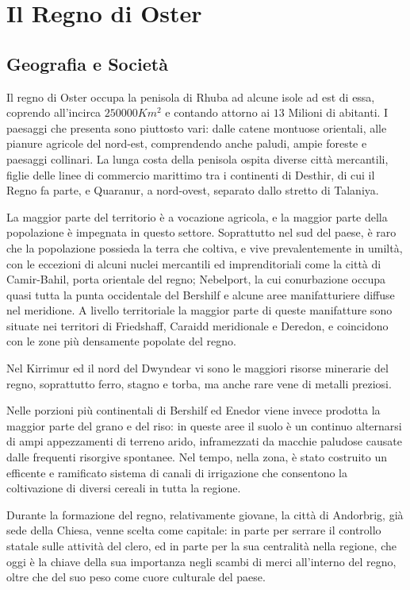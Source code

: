 \section{Il Regno di Oster}


\subsection{Geografia e Società}
Il regno di Oster occupa la penisola di Rhuba ad alcune isole ad est di essa, coprendo all'incirca $250000Km^2$ e contando attorno ai $13$ Milioni di abitanti. I paesaggi che presenta sono piuttosto vari: dalle catene montuose orientali, alle pianure agricole del nord-est, comprendendo anche paludi, ampie foreste e paesaggi collinari.
La lunga costa della penisola ospita diverse città mercantili, figlie delle linee di commercio marittimo tra i continenti di Desthir, di cui il Regno fa parte, e Quaranur, a nord-ovest, separato dallo stretto di Talaniya.

La maggior parte del territorio è a vocazione agricola, e la maggior parte della popolazione è impegnata in questo settore. Soprattutto nel sud del paese, è raro che la popolazione possieda la terra che coltiva, e vive prevalentemente in umiltà, con le eccezioni di alcuni nuclei mercantili ed imprenditoriali come la città di Camir-Bahil, porta orientale del regno; Nebelport, la cui conurbazione occupa quasi tutta la punta occidentale del Bershilf e alcune aree manifatturiere diffuse nel meridione.
A livello territoriale la maggior parte di queste manifatture sono situate nei territori di Friedshaff, Caraidd meridionale e Deredon, e coincidono con le zone più densamente popolate del regno.

Nel Kirrimur ed il nord del Dwyndear vi sono le maggiori risorse minerarie del regno, soprattutto ferro, stagno e torba, ma anche rare vene di metalli preziosi.

Nelle porzioni più continentali di Bershilf ed Enedor viene invece prodotta la maggior parte del grano e del riso: in queste aree il suolo è un continuo alternarsi di ampi appezzamenti di terreno arido, inframezzati da macchie paludose causate dalle frequenti risorgive spontanee. Nel tempo, nella zona, è stato costruito un efficente e ramificato sistema di canali di irrigazione che consentono la coltivazione di diversi cereali in tutta la regione.

Durante la formazione del regno, relativamente giovane, la città di Andorbrig, già sede della Chiesa, venne scelta come capitale: in parte per serrare il controllo statale sulle attività del clero, ed in parte per la sua centralità nella regione, che oggi è la chiave della sua importanza negli scambi di merci all'interno del regno, oltre che del suo peso come cuore culturale del paese.

